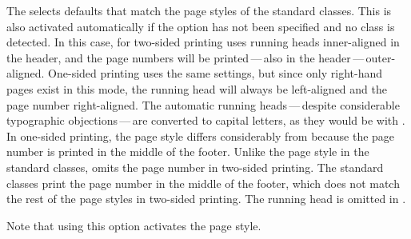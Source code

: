The 
 selects defaults that match the page styles of the standard
classes. This is also activated automatically if the option has not been
specified and no \KOMAScript{} class is detected. In this case, for two-sided
printing  uses running heads
inner-aligned in the header, and the page numbers will be printed\,---\,also
in the header\,---\,outer-aligned. One-sided printing uses the same settings,
but since only right-hand pages exist in this mode, the running head will
always be left-aligned and the page number right-aligned. The automatic
running heads\,---\,despite considerable typographic objections\,---\,are
converted to capital letters, as they would be with
%
. In one-sided
printing, the  page style
differs considerably from  because
the page number is printed in the middle of the footer.
Unlike the  page
style in the standard classes,
 omits the page number in
two-sided printing. The standard classes print the page number in the middle
of the footer, which does not match the rest of the page styles in two-sided
printing.
\iffalse %
  If you want the page number back
\begin{lstcode}
  \cfoot[\pagemark]{}
\end{lstcode}
  will restore it. %
\fi%
The running head is omitted in .

Note that using this option activates the
%
 page style.
\iffalse%
  This also applies if you use the option within the document.%
\fi
%
\EndIndexGroup



